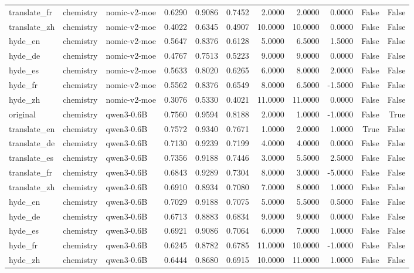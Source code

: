 \begin{tabular}{lllrrrrrrrr}
translate\_fr & chemistry & nomic-v2-moe & 0.6290 & 0.9086 & 0.7452 & 2.0000 & 2.0000 & 0.0000 & False & False \\
translate\_zh & chemistry & nomic-v2-moe & 0.4022 & 0.6345 & 0.4907 & 10.0000 & 10.0000 & 0.0000 & False & False \\
hyde\_en & chemistry & nomic-v2-moe & 0.5647 & 0.8376 & 0.6128 & 5.0000 & 6.5000 & 1.5000 & False & False \\
hyde\_de & chemistry & nomic-v2-moe & 0.4767 & 0.7513 & 0.5223 & 9.0000 & 9.0000 & 0.0000 & False & False \\
hyde\_es & chemistry & nomic-v2-moe & 0.5633 & 0.8020 & 0.6265 & 6.0000 & 8.0000 & 2.0000 & False & False \\
hyde\_fr & chemistry & nomic-v2-moe & 0.5562 & 0.8376 & 0.6549 & 8.0000 & 6.5000 & -1.5000 & False & False \\
hyde\_zh & chemistry & nomic-v2-moe & 0.3076 & 0.5330 & 0.4021 & 11.0000 & 11.0000 & 0.0000 & False & False \\
original & chemistry & qwen3-0.6B & 0.7560 & 0.9594 & 0.8188 & 2.0000 & 1.0000 & -1.0000 & False & True \\
translate\_en & chemistry & qwen3-0.6B & 0.7572 & 0.9340 & 0.7671 & 1.0000 & 2.0000 & 1.0000 & True & False \\
translate\_de & chemistry & qwen3-0.6B & 0.7130 & 0.9239 & 0.7199 & 4.0000 & 4.0000 & 0.0000 & False & False \\
translate\_es & chemistry & qwen3-0.6B & 0.7356 & 0.9188 & 0.7446 & 3.0000 & 5.5000 & 2.5000 & False & False \\
translate\_fr & chemistry & qwen3-0.6B & 0.6843 & 0.9289 & 0.7304 & 8.0000 & 3.0000 & -5.0000 & False & False \\
translate\_zh & chemistry & qwen3-0.6B & 0.6910 & 0.8934 & 0.7080 & 7.0000 & 8.0000 & 1.0000 & False & False \\
hyde\_en & chemistry & qwen3-0.6B & 0.7029 & 0.9188 & 0.7075 & 5.0000 & 5.5000 & 0.5000 & False & False \\
hyde\_de & chemistry & qwen3-0.6B & 0.6713 & 0.8883 & 0.6834 & 9.0000 & 9.0000 & 0.0000 & False & False \\
hyde\_es & chemistry & qwen3-0.6B & 0.6921 & 0.9086 & 0.7064 & 6.0000 & 7.0000 & 1.0000 & False & False \\
hyde\_fr & chemistry & qwen3-0.6B & 0.6245 & 0.8782 & 0.6785 & 11.0000 & 10.0000 & -1.0000 & False & False \\
hyde\_zh & chemistry & qwen3-0.6B & 0.6444 & 0.8680 & 0.6915 & 10.0000 & 11.0000 & 1.0000 & False & False \\

\end{tabular}
